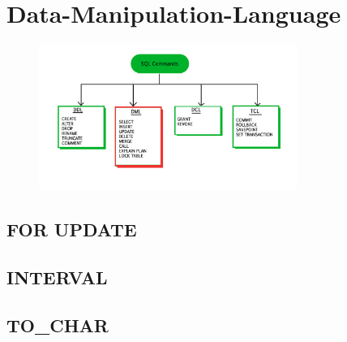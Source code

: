 \section[DML]{Data-Manipulation-Language}
\label{sec:dml}

\begin{figure}[h]
  \centering
  \includegraphics[width=0.75\textwidth]{img//sql-commands-dml.jpg}
  \label{img:dml}
\end{figure}

\subsection{FOR UPDATE}
\label{sec:dml.for_update}

\subsection{INTERVAL}
\label{sec:dml.interval}

\subsection{TO\_CHAR}
\label{sec:dml.to_char}
